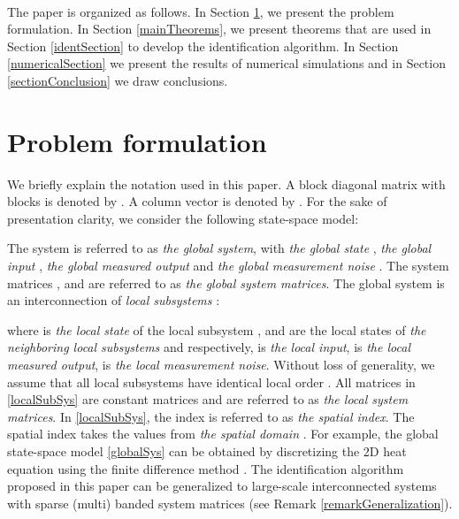 \documentclass[journal,10pt]{IEEEtran}
\begin{document}
\\
The paper is organized as follows. In Section \ref{problemFormulation}, we present the problem formulation. In Section \ref{mainTheorems}, we present theorems that are used in Section \ref{identSection} to develop the identification algorithm. In Section \ref{numericalSection} we present the results of numerical simulations and in Section \ref{sectionConclusion} we draw conclusions.
\section{Problem formulation}
\label{problemFormulation}
We briefly explain the notation used in this paper. A block diagonal matrix  with blocks  is denoted by . A column vector  is denoted by .
For the sake of presentation clarity, we consider the following state-space model: 
\begin{small}

\end{small}
\begin{small}

\end{small}
\begin{small}

\end{small}
The system  is referred to as \textit{the global system}, with \textit{the global state} , \textit{the global input} , \textit{the global measured output}  and \textit{the global measurement noise} . The system matrices ,  and  are referred to as \textit{the global system matrices}. The global system  is an interconnection of  \textit{local subsystems} : 
\begin{small}

\end{small}
where  is \textit{the local state} of the local subsystem ,  and  are the local states of \textit{the neighboring local subsystems}  and  respectively,  is \textit{the local input},  is \textit{the local measured output},  is \textit{the local measurement noise}. Without loss of generality, we assume that all local subsystems have identical local order . All matrices in \eqref{localSubSys} are constant matrices and are referred to as \textit{the local system matrices}. In \eqref{localSubSys}, the index  is referred to as \textit{the spatial index}. The spatial index takes the values from \textit{the spatial domain}  . For example, the global state-space model \eqref{globalSys} can be obtained by discretizing the 2D heat equation using the finite difference method \cite{benner2004,haberThesis}. The identification algorithm proposed in this paper can be generalized to large-scale interconnected systems with sparse (multi) banded system matrices (see Remark \ref{remarkGeneralization}).
\end{document}
